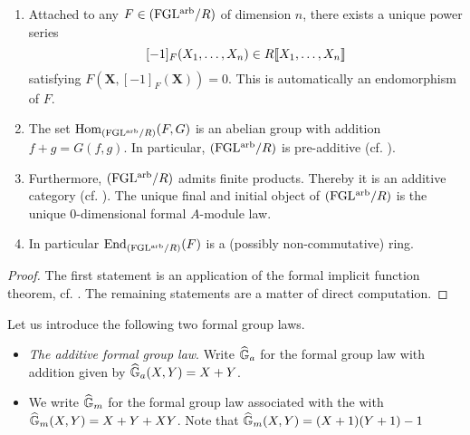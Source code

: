 \documentclass[../main.tex]{subfiles}
\begin{document}
\begin{lem}\label{lem:FGLAdditive}
  \begin{enumerate}
    \item Attached to any $F \in {(\mathrm{FGL^{arb}}/{R})}$ of dimension $n$, there exists
      a unique power series 
      $$[-1]_F(X_1, \dots, X_n) \in R\llbracket X_1, \dots, X_n\rrbracket$$
      satisfying $F(\mathbf X, [-1]_F(\mathbf X)) = 0$. This is automatically
      an endomorphism of $F$. 
    \item The set $\operatorname{Hom}_{{(\mathrm{FGL^{arb}}/{R})}} (F,G)$
      is an abelian group with addition $f+g = G(f,g)$. 
      In particular, ${(\mathrm{FGL^{arb}}/{R})}$ is pre-additive (cf.
      \cite[\href{https://stacks.math.columbia.edu/tag/00ZY}{Tag
      00ZY}]{stacks-project}).     
    \item Furthermore, ${(\mathrm{FGL^{arb}}/{R})}$ admits finite products. Thereby it is 
      an additive category (cf. \cite[\href{https://stacks.math.columbia.edu/tag/0104}{Tag
      0104}]{stacks-project}).
      The unique final and initial object of ${(\mathrm{FGL^{arb}}/{R})}$ is the unique
      $0$-dimensional formal $A$-module law.
    \item In particular $\operatorname{End}_{{(\mathrm{FGL^{arb}}/{R})}}(F)$ is a (possibly non-commutative)
      ring.
  \end{enumerate}
  \begin{proof}
    The first statement is an application of the formal implicit function theorem,
    cf. . The remaining statements are a matter of direct computation.
  \end{proof}
\end{lem}

\begin{xpl} Let us introduce the following two formal group laws.
  \begin{itemize}
    \item \textit{The additive formal group law}. Write 
      $\widehat{\mathbb{G}}_a$ for the formal group law with addition given by 
      $\widehat{\mathbb{G}}_a(X,Y) = X + Y$. 
    \item We write $\widehat{\mathbb{G}}_m$ for the formal group law associated with the 
      with $\widehat{\mathbb{G}}_m(X,Y) = X + Y + XY$. Note that $\widehat{\mathbb{G}}_m(X,Y) = (X+1)(Y+1) - 1$
  \end{itemize}
\end{xpl}
\end{document}
